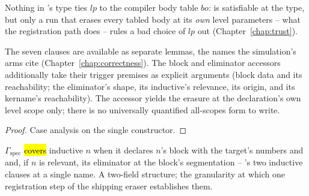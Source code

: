 \begin{remark}
 Nothing in \ErasesEnv{}'s type ties $\mathit{lp}$ to the compiler body table
$\mathit{bo}$:  is satisfiable at the type, but only a run that erases every
tabled body at its \emph{own} level parameters -- what the registration path does -- rules a
bad choice of $\mathit{lp}$ out (Chapter~\ref{chap:trust}).
\end{remark}

\begin{lemma}
\label{lem:ErasesEnv-keys}
\leanok
{}
 The seven clauses are available as separate lemmas, the names the simulation's arms cite (Chapter~\ref{chap:correctness}).
 The block and eliminator accessors additionally take their trigger premises as explicit arguments (block data and its reachability; the eliminator's shape, its inductive's relevance, its origin, and its kername's reachability). The  accessor yields the erasure at the declaration's own level scope only; there is no universally quantified all-scopes form to write.
\end{lemma}
\begin{proof}
\leanok
{}
 Case analysis on the single constructor.
\end{proof}

\begin{definition}
\label{def:IndCovered}
\leanok
{}
 $\Gamma_{\mathrm{spec}}$ \hl{covers} inductive $n$ when it declares $n$'s block with the target's numbers and  and, if $n$ is relevant, its  eliminator at the block's segmentation -- \ErasesEnv{}'s two inductive clauses at a single name.
 A two-field structure; the granularity at which one registration step of the shipping eraser establishes them.
\end{definition}

